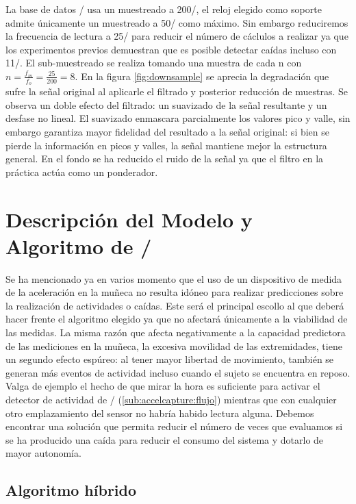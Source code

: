 La base de datos \sisfall/ usa un muestreado a 200\hz/, el reloj elegido como soporte admite únicamente un muestreado a 50\hz/ como máximo. Sin embargo reduciremos la frecuencia de lectura a 25\hz/ para reducir el número de cáclulos a realizar ya que los experimentos previos demuestran que es posible detectar caídas incluso con 11\hz/. El sub-muestreado se realiza tomando una muestra de cada n con $n=\frac{f_m}{f_o}=\frac{25}{200}=8$. En la figura \ref{fig:downsample} se aprecia la degradación que sufre la señal original al aplicarle el filtrado y posterior reducción de muestras. Se observa un doble efecto del filtrado: un suavizado de la señal resultante y un desfase no lineal. El suavizado enmascara parcialmente los valores pico y valle, sin embargo garantiza mayor fidelidad del resultado a la señal original: si bien se pierde la información en picos y valles, la señal mantiene mejor la estructura general. En el fondo se ha reducido el ruido de la señal ya que el filtro en la práctica actúa como un ponderador.


\section{Descripción del Modelo y Algoritmo de \ifell/}\label{sec:imp:model}

Se ha mencionado ya en varios momento que el uso de un dispositivo de medida de la aceleración en la muñeca no resulta idóneo para realizar predicciones sobre la realización de actividades o caídas. Este será el principal escollo al que deberá hacer frente el algoritmo elegido ya que no afectará únicamente a la viabilidad de las medidas. La misma razón que afecta negativamente a la capacidad predictora de las mediciones en la muñeca, la excesiva movilidad de las extremidades, tiene un segundo efecto espúreo: al tener mayor libertad de movimiento, también se generan más eventos de actividad incluso cuando el sujeto se encuentra en reposo. Valga de ejemplo el hecho de que mirar la hora es suficiente para activar el detector de actividad de \accelcapture/ (\autoref{sub:accelcapture:flujo}) mientras que con cualquier otro emplazamiento del sensor no habría habido lectura alguna. Debemos encontrar una solución que permita reducir el número de veces que evaluamos si se ha producido una caída para reducir el consumo del sistema y dotarlo de mayor autonomía.

\subsection{Algoritmo híbrido}\label{sub:imp:model:algoritmo}

